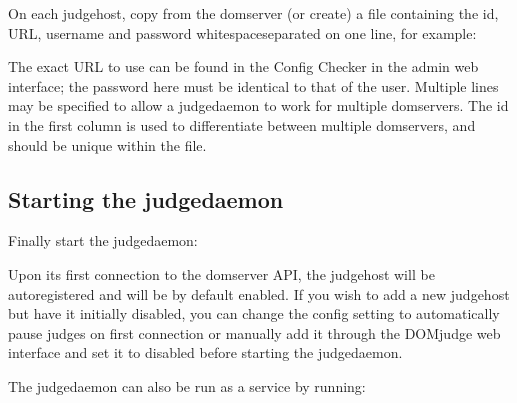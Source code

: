 \documentclass[a4paper,10pt,english,openany]{sphinxmanual}
\begin{document}
\sphinxAtStartPar
On each judgehost, copy from the domserver (or create) a file
 containing the id, URL,
username and password whitespace\sphinxhyphen{}separated on one line, for example:

\begin{sphinxVerbatim}[commandchars=\\\{\}]
     
\end{sphinxVerbatim}

\sphinxAtStartPar
The exact URL to use can be found in the Config Checker in the
admin web interface; the password here must be identical to that of the
 user. Multiple lines may be specified to allow a
judgedaemon to work for multiple domservers. The id in the first column
is used to differentiate between multiple domservers, and should be
unique within the  file.


\subsection{Starting the judgedaemon}
\label{\detokenize{install-judgehost:starting-the-judgedaemon}}\label{\detokenize{install-judgehost:start-judgedaemon}}
\sphinxAtStartPar
Finally start the judgedaemon:

\begin{sphinxVerbatim}[commandchars=\\\{\}]
  
\end{sphinxVerbatim}

\sphinxAtStartPar
Upon its first connection to the domserver API, the judgehost will be
auto\sphinxhyphen{}registered and will be by default enabled. If you wish to
add a new judgehost but have it initially disabled, you can change the config
setting to automatically pause judges on first connection or manually add it
through the DOMjudge web interface and set it to disabled before starting
the judgedaemon.

\sphinxAtStartPar
The judgedaemon can also be run as a service by running:

\begin{sphinxVerbatim}[commandchars=\\\{\}]
    
\end{sphinxVerbatim}
\end{document}
